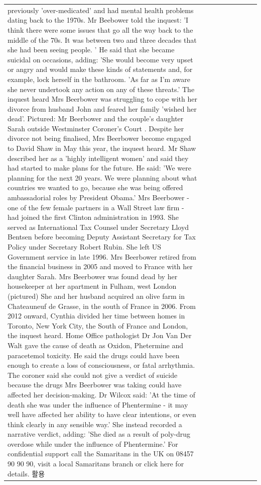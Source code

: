 \begin{table}[H]
\begin{tabular}{lllrlllll}
previously 'over-medicated' and had mental health problems dating back to the 1970s. Mr Beebower told the inquest: 'I think there were some issues that go all the way back to the middle of the 70s. It was between two and three decades that she had been seeing people. ' He said that she became suicidal on occasions, adding: 'She would become very upset or angry and would make these kinds of statements and, for example, lock herself in the bathroom. 'As far as I'm aware she never undertook any action on any of these threats.' The inquest heard Mrs Beerbower was struggling to cope with her divorce from husband John and feared her family 'wished her dead'. Pictured: Mr Beerbower and the couple's daughter Sarah outside Westminster Coroner's Court . Despite her divorce not being finalised, Mrs Beerbower become engaged to David Shaw in May this year, the inquest heard. Mr Shaw described her as a 'highly intelligent women' and said they had started to make plans for the future. He said: 'We were planning for the next 20 years. We were planning about what countries we wanted to go, because she was being offered ambassadorial roles by President Obama.' Mrs Beerbower - one of the few female partners in a Wall Street law firm - had joined the first Clinton administration in 1993. She served as International Tax Counsel under Secretary Lloyd Bentsen before becoming Deputy Assistant Secretary for Tax Policy under Secretary Robert Rubin. She left US Government service in late 1996. Mrs Beerbower retired from the financial business in 2005 and moved to France with her daughter Sarah. Mrs Beerbower was found dead by her housekeeper at her apartment in Fulham, west London (pictured) She and her husband acquired an olive farm in Chateauneuf de Grasse, in the south of France in 2006. From 2012 onward, Cynthia divided her time between homes in Toronto, New York City, the South of France and London, the inquest heard. Home Office pathologist Dr Jon Van Der Walt gave the cause of death as Oxidon, Phetermine and paracetemol toxicity. He said the drugs could have been enough to create a loss of consciousness, or fatal arrhythmia. The coroner said she could not give a verdict of suicide because the drugs Mrs Beerbower was taking could have affected her decision-making. Dr Wilcox said: 'At the time of death she was under the influence of Phentermine - it may well have affected her ability to have clear intentions, or even think clearly in any sensible way.' She instead recorded a narrative verdict, adding: 'She died as a result of poly-drug overdose while under the influence of Phentermine.' For confidential support call the Samaritans in the UK on 08457 90 90 90, visit a local Samaritans branch or click here for details. 활용 \\

\end{tabular}
\end{table}
